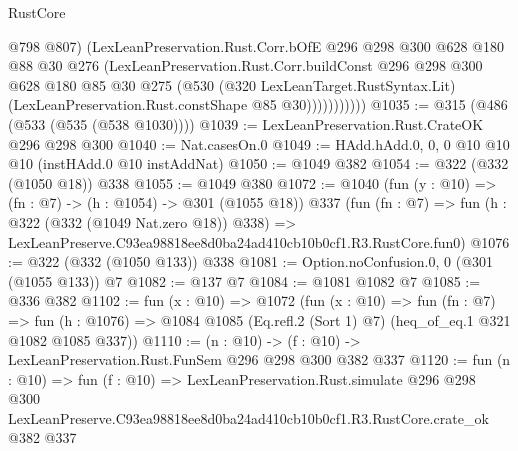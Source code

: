 \begin{lexlean}{RustCore}
\begin{coremodule}
                    @798
                    @807)
                  (LexLeanPreservation.Rust.Corr.bOfE
                    @296
                    @298
                    @300
                    @628
                    @180
                    @88
                    @30
                    @276
                    (LexLeanPreservation.Rust.Corr.buildConst
                      @296
                      @298
                      @300
                      @628
                      @180
                      @85
                      @30
                      @275
                      (@530
                        (@320 LexLeanTarget.RustSyntax.Lit)
                        (LexLeanPreservation.Rust.constShape @85 @30)))))))))))
@1035 := @315 (@486 (@533 (@535 (@538 @1030))))
@1039 := LexLeanPreservation.Rust.CrateOK @296 @298 @300
@1040 := Nat.casesOn.{0}
@1049 := HAdd.hAdd.{0, 0, 0} @10 @10 @10 (instHAdd.{0} @10 instAddNat)
@1050 := @1049 @382
@1054 := @322 (@332 (@1050 @18)) @338
@1055 := @1049 @380
@1072 := @1040
    (fun (y : @10) => (fn : @7) -> (h : @1054) -> @301 (@1055 @18))
    @337
    (fun (fn : @7) =>
    fun (h : @322 (@332 (@1049 Nat.zero @18)) @338) =>
    LexLeanPreserve.C93ea98818ee8d0ba24ad410cb10b0cf1.R3.RustCore.fun0)
@1076 := @322 (@332 (@1050 @133)) @338
@1081 := Option.noConfusion.{0, 0} (@301 (@1055 @133)) @7
@1082 := @137 @7
@1084 := @1081 @1082 @7
@1085 := @336 @382
@1102 := fun (x : @10) =>
  @1072
    (fun (x : @10) =>
    fun (fn : @7) =>
    fun (h : @1076) => @1084 @1085 (Eq.refl.{2} (Sort 1) @7) (heq_of_eq.{1} @321 @1082 @1085 @337))
@1110 := (n : @10) -> (f : @10) -> LexLeanPreservation.Rust.FunSem @296 @298 @300 @382 @337
@1120 := fun (n : @10) =>
  fun (f : @10) =>
  LexLeanPreservation.Rust.simulate
    @296
    @298
    @300
    LexLeanPreserve.C93ea98818ee8d0ba24ad410cb10b0cf1.R3.RustCore.crate_ok
    @382
    @337
\end{coremodule}
\end{lexlean}
